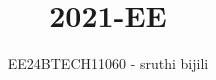 \documentclass[journal]{IEEEtran}
\begin{document}

\vspace{3cm}

\title{2021-EE}
\author{EE24BTECH11060 - sruthi bijili}
{\let\newpage\relax\maketitle}

\renewcommand{\thefigure}{\theenumi}
\renewcommand{\thetable}{\theenumi}
\setlength{\intextsep}{10pt} %


\renewcommand{\thetable}{\theenumi}
\end{document}
